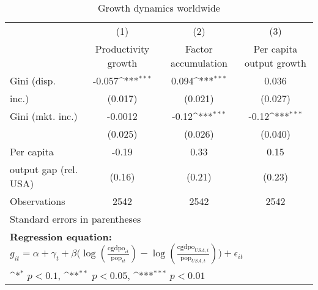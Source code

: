 \begin{sidewaystable}[htbp]\centering
\def\sym#1{\ifmmode^{#1}\else\(^{#1}\)\fi}
\caption{Growth dynamics worldwide}
\begin{tabular}{l*{3}{c}}
\hline\hline
                &\multicolumn{1}{c}{(1)}&\multicolumn{1}{c}{(2)}&\multicolumn{1}{c}{(3)}\\
                &\multicolumn{1}{c}{Productivity growth}&\multicolumn{1}{c}{Factor accumulation}&\multicolumn{1}{c}{Per capita output growth}\\
\hline
Gini (disp.     &   -0.057\sym{***}&    0.094\sym{***}&    0.036         \\
inc.)           &  (0.017)         &  (0.021)         &  (0.027)         \\
[1em]
Gini (mkt. inc.)&  -0.0012         &    -0.12\sym{***}&    -0.12\sym{***}\\
                &  (0.025)         &  (0.026)         &  (0.040)         \\
[1em]
Per capita      &    -0.19         &     0.33         &     0.15         \\
output gap (rel. USA)&   (0.16)         &   (0.21)         &   (0.23)         \\
\hline
Observations    &     2542         &     2542         &     2542         \\
\hline\hline
\multicolumn{4}{l}{\footnotesize Standard errors in parentheses}\\
\multicolumn{4}{l}{\footnotesize \textbf{Regression equation:} \(g_{it} = \alpha + \gamma_t + \beta \big(\log (\frac{\textrm{cgdpo}_{it}}{\textrm{pop}_{it}} ) - \log (\frac{\textrm{cgdpo}_{USA,t}}{\textrm{pop}_{USA,t}}  ) \big) + \epsilon_{it}\)}\\
\multicolumn{4}{l}{\footnotesize \sym{*} \(p<0.1\), \sym{**} \(p<0.05\), \sym{***} \(p<0.01\)}\\
\end{tabular}
\end{sidewaystable}
